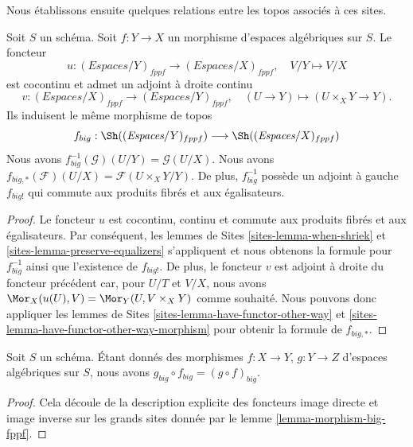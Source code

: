 \noindent
Nous établissons ensuite quelques relations entre les topos
associés à ces sites.

\begin{lemma}
\label{lemma-morphism-big-fppf}
Soit $S$ un schéma.
Soit $f : Y \to X$ un morphisme d'espaces algébriques sur $S$.
Le foncteur
$$
u : (\textit{Espaces}/Y)_{fppf} \longrightarrow (\textit{Espaces}/X)_{fppf},
\quad
V/Y \longmapsto V/X
$$
est cocontinu et admet un adjoint à droite continu
$$
v : (\textit{Espaces}/X)_{fppf} \longrightarrow (\textit{Espaces}/Y)_{fppf},
\quad
(U \to Y) \longmapsto (U \times_X Y \to Y).
$$
Ils induisent le même morphisme de topos
$$
f_{big} :
\Sh((\textit{Espaces}/Y)_{fppf})
\longrightarrow
\Sh((\textit{Espaces}/X)_{fppf})
$$
Nous avons $f_{big}^{-1}(\mathcal{G})(U/Y) = \mathcal{G}(U/X)$.
Nous avons $f_{big, *}(\mathcal{F})(U/X) = \mathcal{F}(U \times_X Y/Y)$.
De plus, $f_{big}^{-1}$ possède un adjoint à gauche $f_{big!}$ qui commute aux
produits fibrés et aux égalisateurs.
\end{lemma}

\begin{proof}
Le foncteur $u$ est cocontinu, continu et commute aux produits fibrés
et aux égalisateurs. Par conséquent,
les lemmes de Sites \ref{sites-lemma-when-shriek} et
\ref{sites-lemma-preserve-equalizers}
s'appliquent et nous obtenons la formule
pour $f_{big}^{-1}$ ainsi que l'existence de $f_{big!}$. De plus,
le foncteur $v$ est adjoint à droite du foncteur précédent car, pour $U/T$ et $V/X$,
nous avons $\Mor_X(u(U), V) = \Mor_Y(U, V \times_X Y)$
comme souhaité. Nous pouvons donc appliquer
les lemmes de Sites \ref{sites-lemma-have-functor-other-way} et
\ref{sites-lemma-have-functor-other-way-morphism} pour obtenir la
formule de $f_{big, *}$.
\end{proof}

\begin{lemma}
\label{lemma-composition-fppf}
Soit $S$ un schéma. Étant donnés des morphismes $f : X \to Y$, $g : Y \to Z$
d'espaces algébriques sur $S$, nous avons
$g_{big} \circ f_{big} = (g \circ f)_{big}$.
\end{lemma}

\begin{proof}
Cela découle de la description explicite des foncteurs image directe
et image inverse sur les grands sites donnée par le
lemme \ref{lemma-morphism-big-fppf}.
\end{proof}








